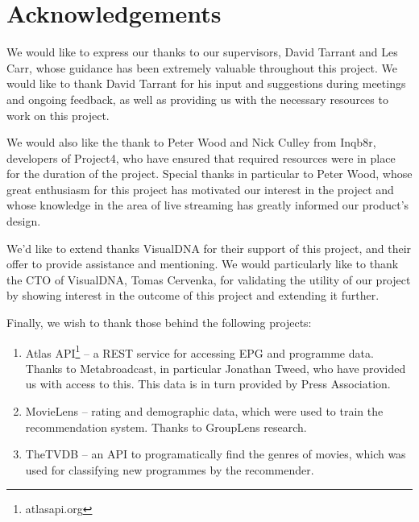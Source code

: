 \section{Acknowledgements}

We would like to express our thanks to our supervisors, David Tarrant and Les Carr, whose guidance has been extremely valuable throughout this project. We would like to thank David Tarrant for his input and suggestions during meetings and ongoing feedback, as well as providing us with the necessary resources to work on this project.

We would also like the thank to Peter Wood and Nick Culley from Inqb8r, developers of Project4, who have ensured that required resources were in place for the duration of the project. Special thanks in particular to Peter Wood, whose great enthusiasm for this project has motivated our interest in the project and whose knowledge in the area of live streaming has greatly informed our product's design.

We'd like to extend thanks VisualDNA for their support of this project, and their offer to provide assistance and mentioning. We would particularly like to thank the CTO of VisualDNA, Tomas Cervenka, for validating the utility of our project by showing interest in the outcome of this project and extending it further.

Finally, we wish to thank those behind the following projects:
\begin{enumerate}
\item Atlas API\footnote{atlasapi.org} -- a REST service for accessing EPG and programme data. Thanks to Metabroadcast, in particular Jonathan Tweed, who have provided us with access to this. This data is in turn provided by Press Association.
\item MovieLens -- rating and demographic data, which were used to train the recommendation system. Thanks to GroupLens research.
\item TheTVDB -- an API to programatically find the genres of movies, which was used for classifying new programmes by the recommender.
\end{enumerate}

\cleardoublepage
\setcounter{tocdepth}{2}

\begin{comment}
	\tableofcontents
	\newpage
	\cleardoublepage
	\setcounter{page}{0}
	\pagenumbering{arabic}
	\cleardoublepage
\end{comment}

